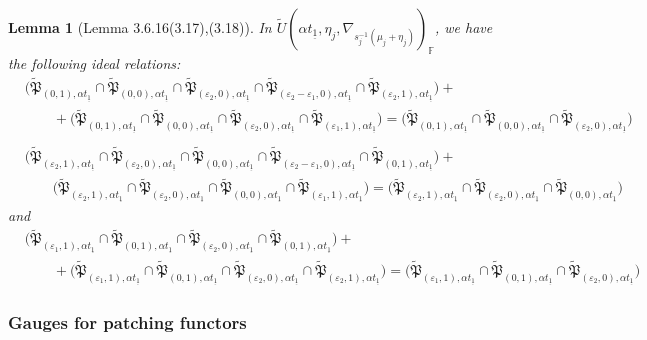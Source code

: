 \documentclass[oneside,a4paper,english, 11pt]{amsart}
\theoremstyle{plain}
\theoremstyle{plain}
\theoremstyle{plain}
\newtheorem{lemma}[thm]{Lemma}
\theoremstyle{plain}
\theoremstyle{plain}
\theoremstyle{plain}
\theoremstyle{definition}
\theoremstyle{definition}
\theoremstyle{definition}
\theoremstyle{remark}
\numberwithin{equation}{section}
\newcommand{\F}{\mathbb{F}}
\newcommand{\fP}{\mathfrak{P}}
\newcommand{\eps}{\varepsilon}
\newcommand{\un}[1]{\underline{#1}}
\newcommand{\tld}[1]{\widetilde{#1}}
\begin{document}
\begin{lemma}[Lemma 3.6.16(3.17),(3.18)\cite{LLLM2}]
\label{lem:ideal:relation:4}
 In $\tld{U}(\alpha t_{\un{1}}, \eta_j,\nabla_{s_j^{-1}(\mu_j+\eta_j)})_{\F}$, we have the following ideal relations:
\begin{align*}
&\Big(\tld{\fP}_{(0,1),\alpha t_{\un{1}}}\cap \tld{\fP}_{(0,0),\alpha t_{\un{1}}}\cap \tld{\fP}_{(\eps_2,0),\alpha t_{\un{1}}}\cap \tld{\fP}_{(\eps_2-\eps_1,0),\alpha t_{\un{1}}}\cap \tld{\fP}_{(\eps_2,1),\alpha t_{\un{1}}}\Big)+\\&\qquad+\Big(\tld{\fP}_{(0,1),\alpha t_{\un{1}}}\cap \tld{\fP}_{(0,0),\alpha t_{\un{1}}}\cap \tld{\fP}_{(\eps_2,0),\alpha t_{\un{1}}}\cap \tld{\fP}_{(\eps_1,1),\alpha t_{\un{1}}}\Big)=\Big(\tld{\fP}_{(0,1),\alpha t_{\un{1}}}\cap \tld{\fP}_{(0,0),\alpha t_{\un{1}}}\cap \tld{\fP}_{(\eps_2,0),\alpha t_{\un{1}}}
\Big)\\
\\
&\Big(\tld{\fP}_{(\eps_2,1),\alpha t_{\un{1}}}\cap \tld{\fP}_{(\eps_2,0),\alpha t_{\un{1}}}\cap \tld{\fP}_{(0,0),\alpha t_{\un{1}}}\cap \tld{\fP}_{(\eps_2-\eps_1,0),\alpha t_{\un{1}}}\cap \tld{\fP}_{(0,1),\alpha t_{\un{1}}}\Big)+\\&\qquad\Big(\tld{\fP}_{(\eps_2,1),\alpha t_{\un{1}}}\cap \tld{\fP}_{(\eps_2,0),\alpha t_{\un{1}}}\cap \tld{\fP}_{(0,0),\alpha t_{\un{1}}}\cap \tld{\fP}_{(\eps_1,1),\alpha t_{\un{1}}}\Big)=\Big(\tld{\fP}_{(\eps_2,1),\alpha t_{\un{1}}}\cap \tld{\fP}_{(\eps_2,0),\alpha t_{\un{1}}}\cap \tld{\fP}_{(0,0),\alpha t_{\un{1}}}
\Big)
\end{align*}
and
\begin{align*}
&\Big(\tld{\fP}_{(\eps_1,1),\alpha t_{\un{1}}}\cap \tld{\fP}_{(0,1),\alpha t_{\un{1}}}\cap \tld{\fP}_{(\eps_2,0),\alpha t_{\un{1}}}\cap \tld{\fP}_{(0,1),\alpha t_{\un{1}}}\Big)+\\&\qquad+\Big(\tld{\fP}_{(\eps_1,1),\alpha t_{\un{1}}}\cap \tld{\fP}_{(0,1),\alpha t_{\un{1}}}\cap \tld{\fP}_{(\eps_2,0),\alpha t_{\un{1}}}\cap \tld{\fP}_{(\eps_2,1),\alpha t_{\un{1}}}\Big)=\Big(\tld{\fP}_{(\eps_1,1),\alpha t_{\un{1}}}\cap \tld{\fP}_{(0,1),\alpha t_{\un{1}}}\cap \tld{\fP}_{(\eps_2,0),\alpha t_{\un{1}}}\Big)
\end{align*}
\end{lemma}
%
%



\subsubsection{Gauges for patching functors}
\label{sec:gauge}
\end{document}

